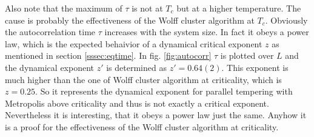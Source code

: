     Also note that the maximum of \(\tau\) is not at \(T_c\) but at a higher
    temperature. The cause is probably the effectiveness of the Wolff cluster
    algorithm at \(T_c\).
    Obviously the autocorrelation time \(\tau\) increases with the system
    size. In fact it obeys a power law, which is the expected behaivior of
    a dynamical critical exponent \(z\) as mentioned in section \ref{sssec:eqtime}.
    In fig. \ref{fig:autocorr} \(\tau\) is plotted
    over \(L\) and the dynamical exponent \(z'\) is determined as \(z'=0.64(2)\).
    This exponent is much higher than the one of Wolff cluster
    algorithm at criticality, which is \(z=0.25\)\cite{NewmanBarkema1999}.
    So it represents the dynamical exponent for parallel tempering with
    Metropolis above criticality and thus is not exactly a critical exponent.
    Nevertheless it is interesting, that it obeys a power law just the same.
    Anyhow it is a proof for the effectiveness of the Wolff cluster algorithm
    at criticality.

